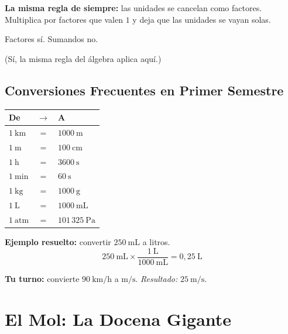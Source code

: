 \documentclass[12pt, letterpaper]{article}
\begin{document}
\begin{cuadroteoria}
  \textbf{La misma regla de siempre:} las unidades se cancelan como factores. Multiplica por factores que valen $1$ y deja que las unidades se vayan solas.\\[4pt]
  \centerline{\nxheav Factores sí. Sumandos no.}
  \vspace{2pt}
  (Sí, la misma regla del álgebra aplica aquí.)
\end{cuadroteoria}

\subsection{Conversiones Frecuentes en Primer Semestre}

\begin{cuadroinfo}
  \centering\small
  \begin{tabular}{lcl}
    \toprule
    \textbf{De} & $\longrightarrow$ & \textbf{A} \\
    \midrule
    $1\ \text{km}$   & $=$ & $1000\ \text{m}$   \\
    $1\ \text{m}$    & $=$ & $100\ \text{cm}$    \\
    $1\ \text{h}$    & $=$ & $3600\ \text{s}$    \\
    $1\ \text{min}$  & $=$ & $60\ \text{s}$      \\
    $1\ \text{kg}$   & $=$ & $1000\ \text{g}$    \\
    $1\ \text{L}$    & $=$ & $1000\ \text{mL}$   \\
    $1\ \text{atm}$  & $=$ & $101\,325\ \text{Pa}$ \\
    \bottomrule
  \end{tabular}
\end{cuadroinfo}

\begin{cuadropasos}
  \textbf{Ejemplo resuelto:} convertir $250\ \text{mL}$ a litros.
  \[
    250\ \text{mL} \times \frac{1\ \text{L}}{1000\ \text{mL}} = 0{,}25\ \text{L}
  \]
\end{cuadropasos}

\noindent\textbf{Tu turno:} convierte $90\ \text{km/h}$ a $\text{m/s}$. \emph{Resultado:} $25\ \text{m/s}$.


\section{El Mol: La Docena Gigante}
\end{document}
